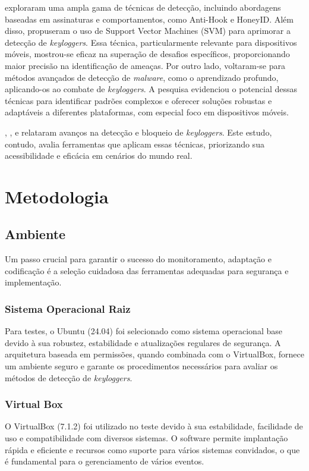 \documentclass[12pt]{article}
\begin{document}
\citep{solairaj2016keyloggers} exploraram uma ampla gama de técnicas de detecção, incluindo abordagens baseadas em assinaturas e comportamentos, como Anti-Hook e HoneyID. Além disso, propuseram o uso de Support Vector Machines (SVM) para aprimorar a detecção de \textit{keyloggers}. Essa técnica, particularmente relevante para dispositivos móveis, mostrou-se eficaz na superação de desafios específicos, proporcionando maior precisão na identificação de ameaças. Por outro lado, \citep{aslan2020comprehensive} voltaram-se para métodos avançados de detecção de \textit{malware}, como o aprendizado profundo, aplicando-os ao combate de \textit{keyloggers}. A pesquisa evidenciou o potencial dessas técnicas para identificar padrões complexos e oferecer soluções robustas e adaptáveis a diferentes plataformas, com especial foco em dispositivos móveis.

\citep{singh2021keylogger}, \citep{wajahat2019novel}, \citep{solairaj2016keyloggers} e \citep{aslan2020comprehensive} relataram avanços na detecção e bloqueio de \textit{keyloggers}. Este estudo, contudo, avalia ferramentas que aplicam essas técnicas, priorizando sua acessibilidade e eficácia em cenários do mundo real.

\section{Metodologia}
\subsection{Ambiente}
Um passo crucial para garantir o sucesso do monitoramento, adaptação e codificação é a seleção cuidadosa das ferramentas adequadas para segurança e implementação.

\subsubsection{Sistema Operacional Raiz}
Para testes, o Ubuntu (24.04) foi selecionado como sistema operacional base devido à sua robustez, estabilidade e atualizações regulares de segurança. A arquitetura baseada em permissões, quando combinada com o VirtualBox, fornece um ambiente seguro e garante os procedimentos necessários para avaliar os métodos de detecção de \textit{keyloggers}.

\subsubsection{Virtual Box}
O VirtualBox (7.1.2) foi utilizado no teste devido à sua estabilidade, facilidade de uso e compatibilidade com diversos sistemas. O software permite implantação rápida e eficiente e recursos como suporte para vários sistemas convidados, o que é fundamental para o gerenciamento de vários eventos.
\end{document}
